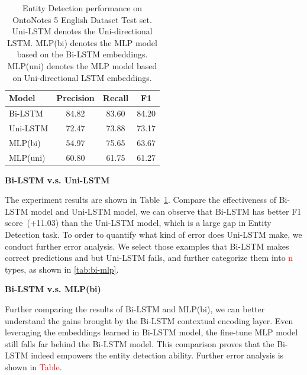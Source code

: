 \documentclass{article}
\newcommand{\red}[1]{\textcolor{red}{#1}}
\begin{document}
\begin{table}[t]
	\centering
	\begin{tabular}{l@{\qquad}ccc}
		\toprule
		\textbf{Model}         & \textbf{Precision} & \textbf{Recall} & \textbf{F1} \\ \midrule
		Bi-LSTM &  84.82 & 83.60  & 84.20 \\
		Uni-LSTM & 72.47 & 73.88 & 73.17 \\
		MLP(bi) & 54.97 & 75.65 & 63.67 \\ 
		MLP(uni) & 60.80 & 61.75 &  61.27 \\ 
		\bottomrule
	\end{tabular}
	\vspace{3mm}
	\caption{Entity Detection performance on OntoNotes 5 English Dataset Test set. Uni-LSTM denotes the Uni-directional LSTM. MLP(bi) denotes the MLP model based on the Bi-LSTM embeddings. MLP(uni) denotes the MLP model based on Uni-directional LSTM embeddings.}
	\label{res:ner}
\end{table}


\noindent \textbf{Bi-LSTM v.s. Uni-LSTM}


The experiment results are shown in Table~\ref{res:ner}. Compare the effectiveness of Bi-LSTM model and Uni-LSTM model, we can observe that Bi-LSTM has better F1 score~(+11.03) than the Uni-LSTM model, which is a large gap in Entity Detection task. To order to quantify what kind of error does Uni-LSTM make, we conduct further error analysis. We select those examples that Bi-LSTM makes correct predictions and but Uni-LSTM fails, and further categorize them into \red{n} types, as shown in \ref{tab:bi-mlp}.



\noindent \textbf{Bi-LSTM v.s. MLP(bi)}

Further comparing the results of Bi-LSTM and MLP(bi), we can better understand the gains brought by the Bi-LSTM contextual encoding layer. Even leveraging the embeddings learned in Bi-LSTM model, the fine-tune MLP model still falls far behind the Bi-LSTM model. This comparison proves that the Bi-LSTM indeed empowers the entity detection ability. Further error analysis is shown in \red{Table}.
\end{document}
